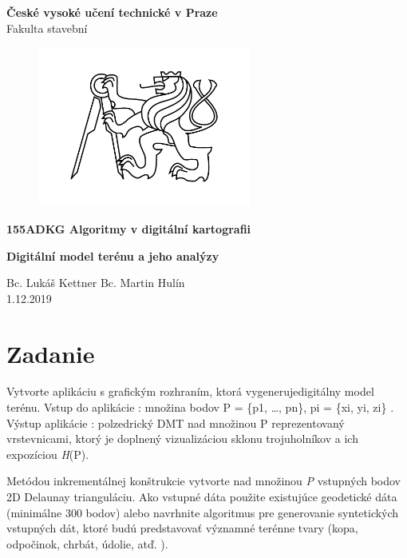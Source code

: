 \documentclass[12pt]{article}
\begin{document}
\begin{titlepage}
\centering
\Large \textbf{České vysoké učení technické v Praze }\\ Fakulta stavební
\vspace{2cm}

\begin{figure}[h!] %
\centering
\includegraphics[width=7cm]{./img/cvut.png}
\end{figure}
 
\Large \textbf{155ADKG Algoritmy v digitální kartografii}
\vspace{1cm}

\LARGE  \textbf{ Digitální model terénu a jeho analýzy}
\vspace{3cm}

\Large Bc. Lukáš Kettner Bc. Martin Hulín \\ 1.12.2019

 \thispagestyle{empty} %
\end{titlepage}

\tableofcontents    %
\newpage %
\section{Zadanie}
Vytvorte aplikáciu s grafickým rozhraním, ktorá vygenerujedigitálny model terénu. Vstup do aplikácie : množina bodov P = \{p1, …, pn\},  p{i} = \{x{i}, y{i}, z{i}\} .
\newline Výstup aplikácie : polzedrický DMT nad množinou P reprezentovaný vrstevnicami, ktorý je doplnený vizualizáciou sklonu trojuholníkov a ich expozíciou  \textit{H}(P).

Metódou inkrementálnej konštrukcie vytvorte nad množinou   \textit{P} vstupných bodov 2D Delaunay trianguláciu. Ako vstupné dáta použite existujúce geodetické dáta (minimálne 300 bodov) alebo navrhnite algoritmus pre generovanie syntetických vstupných dát, ktoré budú predstavovať významné terénne tvary (kopa, odpočinok, chrbát, údolie, atď. ).
\end{document}
